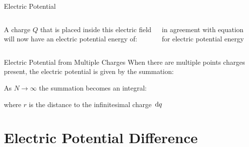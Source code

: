 \documentclass[12pt,aspectratio=169]{beamer}
\begin{document}
\begin{frame}{Electric Potential}
  \begin{columns}
    \centering
    
    A charge $Q$ that is placed inside this electric field will now have an
    electric potential energy of:


    in agreement with equation for electric potential energy
  \end{columns}
\end{frame}



\begin{frame}{Electric Potential from Multiple Charges}
  When there are multiple points charges present, the electric potential is
  given by the summation:


  As $N\rightarrow\infty$ the summation becomes an integral:


  where $r$ is the distance to the infinitesimal charge $\dl q$
\end{frame}



\section{Electric Potential Difference}
\end{document}
